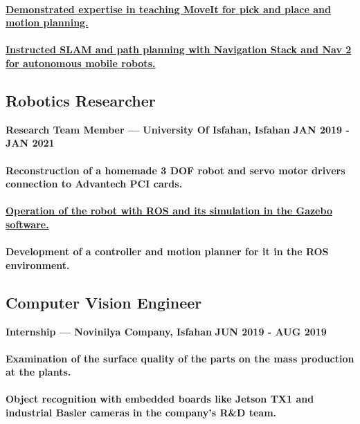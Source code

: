 \documentclass[a4paper]{article}
\begin{document}
\paragraph{\href{https://github.com/ake1999/Robotics_Course_ROS_2023}{Demonstrated expertise in teaching MoveIt for pick and place and motion planning.}}
\paragraph{\href{https://github.com/ake1999/Mobile_Robotics_Course_ROS_2023}{Instructed SLAM and path planning with Navigation Stack and Nav 2 for autonomous mobile robots.}}
\subsection{Robotics Researcher}

{\bfseries\small Research Team Member — University Of Isfahan, Isfahan}
\hfill
{\bfseries\small JAN 2019 - JAN 2021}

\paragraph{Reconstruction of a homemade 3 DOF robot and servo motor drivers connection to Advantech PCI cards.}
\paragraph{\href{https://github.com/ake1999/aarm}{Operation of the robot with ROS and its simulation in the Gazebo software.}}
\paragraph{Development of a controller and motion planner for it in the ROS environment.}

\subsection{Computer Vision Engineer}
{\bfseries\small Internship — Novinilya Company, Isfahan}
\hfill
{\bfseries\small JUN 2019 - AUG 2019}
\nopagebreak
\paragraph{Examination of the surface quality of the parts on the mass production at the plants.}
\paragraph{Object recognition with embedded boards like Jetson TX1 and industrial Basler cameras in the company's R\&D team.}
\end{document}
